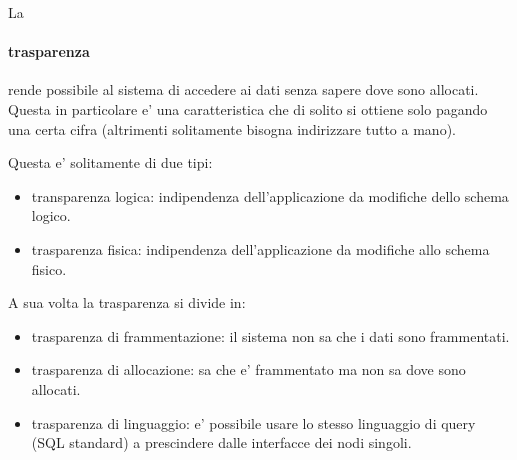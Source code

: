 La \paragraph{trasparenza} rende possibile al sistema di accedere ai dati senza sapere dove sono allocati. Questa in particolare e' una caratteristica che di solito si ottiene solo pagando una certa cifra (altrimenti solitamente bisogna indirizzare tutto a mano).

Questa e' solitamente di due tipi:

\begin{itemize}
  \item transparenza logica: indipendenza dell'applicazione da modifiche dello schema logico.
  \item trasparenza fisica: indipendenza dell'applicazione da modifiche allo schema fisico.
\end{itemize}

A sua volta la trasparenza si divide in:

\begin{itemize}
  \item trasparenza di frammentazione: il sistema non sa che i dati sono frammentati.
  \item trasparenza di allocazione: sa che e' frammentato ma non sa dove sono allocati.
  \item trasparenza di linguaggio: e' possibile usare lo stesso linguaggio di query (SQL standard) a prescindere dalle interfacce dei nodi singoli.
\end{itemize}
